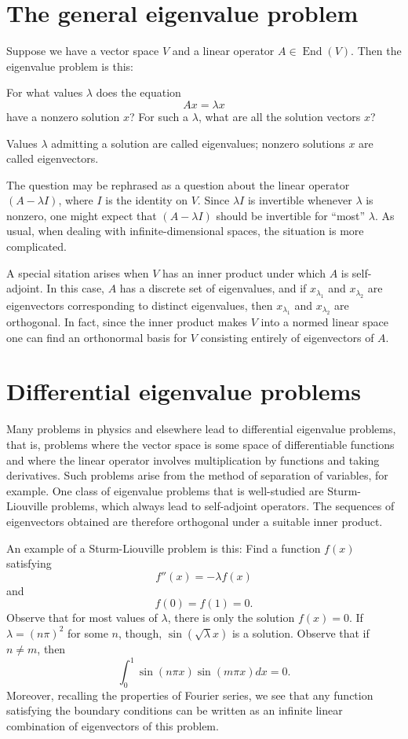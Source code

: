 \documentclass{article}
\begin{document}
\section*{The general eigenvalue problem}

Suppose we have a vector space $V$ and a linear operator
$A\in\operatorname{End}(V)$.  Then the eigenvalue problem is this:

For what values $\lambda$ does the equation
\[
Ax = \lambda x
\]
have a nonzero solution $x$?  For such a $\lambda$, what are all the
solution vectors $x$?

Values $\lambda$ admitting a solution are called eigenvalues; nonzero
solutions $x$ are called eigenvectors.

The question may be rephrased as a question about the linear operator
$(A-\lambda I)$, where $I$ is the identity on $V$.  Since $\lambda I$
is invertible whenever $\lambda$ is nonzero, one might expect that
$(A-\lambda I)$ should be invertible for ``most'' $\lambda$.  As
usual, when dealing with infinite-dimensional spaces, the situation is
more complicated.

A special sitation arises when $V$ has an inner product under which
$A$ is self-adjoint.  In this case, $A$ has a discrete set of
eigenvalues, and if $x_{\lambda_1}$ and $x_{\lambda_2}$ are
eigenvectors corresponding to distinct eigenvalues, then
$x_{\lambda_1}$ and $x_{\lambda_2}$ are orthogonal.  In fact, since
the inner product makes $V$ into a normed linear space one can find an
orthonormal basis for $V$ consisting entirely of eigenvectors of $A$.

\section*{Differential eigenvalue problems}

Many problems in physics and elsewhere lead to differential eigenvalue problems, that is, problems where the vector space is some space of differentiable functions and where the linear operator involves multiplication by functions and taking derivatives.  Such problems arise from the method of separation of variables, for example.  One class of eigenvalue problems that is well-studied are Sturm-Liouville problems, which always lead to self-adjoint operators.  The sequences of eigenvectors obtained are therefore orthogonal under a suitable inner product.  

An example of a Sturm-Liouville problem is this: Find a function $f(x)$ satisfying
\[
f''(x) = -\lambda f(x) 
\]
and
\[
f(0)=f(1)=0.
\]
Observe that for most values of $\lambda$, there is only the solution $f(x)=0$.  If $\lambda=(n\pi)^2$ for some $n$, though, $\sin(\sqrt{\lambda}x)$ is a solution.  Observe that if $n\neq m$, then
\[
\int_0^1 \sin(n\pi x)\sin(m\pi x) dx = 0.
\]
Moreover, recalling the properties of Fourier series, we see that any function satisfying the boundary conditions can be written as an infinite linear combination of eigenvectors of this problem.
\end{document}
